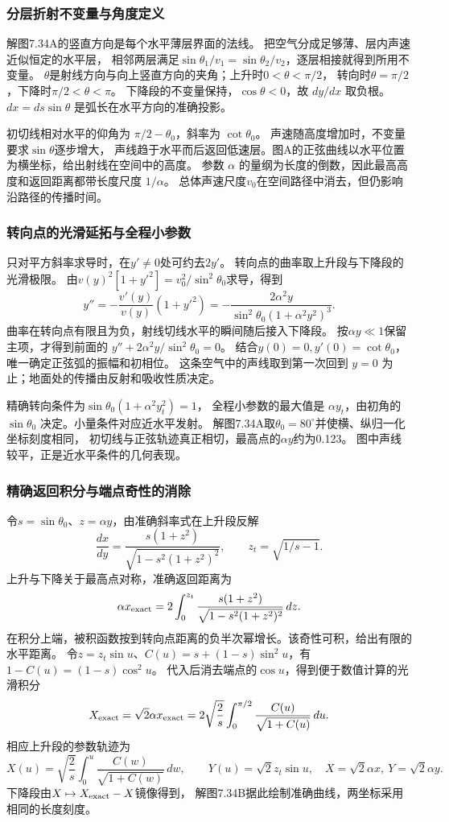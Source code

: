 \documentclass[UTF8,fontset=fandol,a4paper,11pt]{ctexart}
\begin{document}
\subsubsection*{分层折射不变量与角度定义}
解图7.34A的竖直方向是每个水平薄层界面的法线。
把空气分成足够薄、层内声速近似恒定的水平层，
相邻两层满足$\sin\theta_1/v_1=\sin\theta_2/v_2$，逐层相接就得到所用不变量。
$\theta$是射线方向与向上竖直方向的夹角；上升时$0<\theta<\pi/2$，
转向时$\theta=\pi/2$，下降时$\pi/2<\theta<\pi$。
下降段的不变量保持，$\cos\theta<0$，故 $dy/dx$ 取负根。
$dx=ds\sin\theta$ 是弧长在水平方向的准确投影。

初切线相对水平的仰角为 $\pi/2-\theta_0$，斜率为 $\cot\theta_0$。
声速随高度增加时，不变量要求$\sin\theta$逐步增大，
声线趋于水平而后返回低速层。图A的正弦曲线以水平位置为横坐标，给出射线在空间中的高度。
参数 $\alpha$ 的量纲为长度的倒数，因此最高高度和返回距离都带长度尺度 $1/\alpha$。
总体声速尺度$v_0$在空间路径中消去，但仍影响沿路径的传播时间。

\subsubsection*{转向点的光滑延拓与全程小参数}
只对平方斜率求导时，在$y'\ne0$处可约去$2y'$。
转向点的曲率取上升段与下降段的光滑极限。
由$v(y)^2[1+y'^2]=v_0^2/\sin^2\theta_0$求导，得到
\[
y''=-\frac{v'(y)}{v(y)}(1+y'^2)
=-\frac{2\alpha^2y}{\sin^2\theta_0(1+\alpha^2y^2)^3}.
\]
曲率在转向点有限且为负，射线切线水平的瞬间随后接入下降段。
按$\alpha y\ll1$保留主项，才得到前面的
$y''+2\alpha^2y/\sin^2\theta_0=0$。
结合$y(0)=0,y'(0)=\cot\theta_0$，唯一确定正弦弧的振幅和初相位。
这条空气中的声线取到第一次回到 $y=0$ 为止；地面处的传播由反射和吸收性质决定。

精确转向条件为$\sin\theta_0(1+\alpha^2y_t^2)=1$，
全程小参数的最大值是 $\alpha y_t$，由初角的 $\sin\theta_0$ 决定。小量条件对应近水平发射。
解图7.34A取$\theta_0=80^\circ$并使横、纵归一化坐标刻度相同，
初切线与正弦轨迹真正相切，最高点的$\alpha y$约为0.123。
图中声线较平，正是近水平条件的几何表现。

\subsubsection*{精确返回积分与端点奇性的消除}
令$s=\sin\theta_0$、$z=\alpha y$，由准确斜率式在上升段反解
\[
\frac{dx}{dy}=\frac{s(1+z^2)}{\sqrt{1-s^2(1+z^2)^2}},\qquad
z_t=\sqrt{1/s-1}.
\]
上升与下降关于最高点对称，准确返回距离为
\[
\alpha x_{\rm exact}
=2\int_0^{z_t}\frac{s(1+z^2)}{\sqrt{1-s^2(1+z^2)^2}}\,dz.
\]
在积分上端，被积函数按到转向点距离的负半次幂增长。该奇性可积，给出有限的水平距离。
令$z=z_t\sin u$、$C(u)=s+(1-s)\sin^2u$，有
$1-C(u)=(1-s)\cos^2u$。
代入后消去端点的$\cos u$，得到便于数值计算的光滑积分
\[
X_{\rm exact}=\sqrt2\alpha x_{\rm exact}
=2\sqrt{\frac2s}\int_0^{\pi/2}\frac{C(u)}{\sqrt{1+C(u)}}\,du.
\]
相应上升段的参数轨迹为
\[
X(u)=\sqrt{\frac2s}\int_0^u\frac{C(w)}{\sqrt{1+C(w)}}\,dw,
\qquad Y(u)=\sqrt2 z_t\sin u,
\quad X=\sqrt2\alpha x,\ Y=\sqrt2\alpha y.
\]
下降段由$X\mapsto X_{\rm exact}-X$镜像得到，
解图7.34B据此绘制准确曲线，两坐标采用相同的长度刻度。
\end{document}
